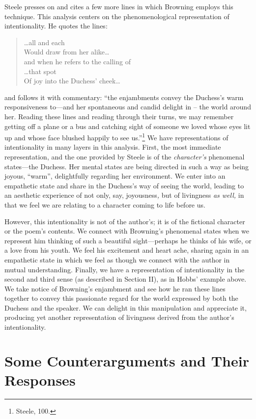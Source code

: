 Steele presses on and cites a few more lines in which Browning employs
this technique. This analysis centers on the phenomenological
representation of intentionality. He quotes the lines:
\begin{quote}
\ldots all and each\\
Would draw from her alike\ldots{}\\
and when he refers to the calling of\\
\ldots that spot\\
Of joy into the Duchess' cheek\ldots
\end{quote}
and follows it with commentary: ``the enjambments convey the Duchess's
warm responsiveness to---and her spontaneous and candid delight in --
the world around her. Reading these lines and reading through their
turns, we may remember getting off a plane or a bus and catching sight
of someone we loved whose eyes lit up and whose face blushed happily to
see us.''\footnote{Steele, 100.} We have representations of
intentionality in many layers in this analysis. First, the most
immediate representation, and the one provided by Steele is of the
\emph{character's} phenomenal states---the Duchess. Her mental states
are being directed in such a way as being joyous, ``warm'', delightfully
regarding her environment. We enter into an empathetic state and share
in the Duchess's way of seeing the world, leading to an aesthetic
experience of not only, say, joyousness\emph{,} but of livingness
\emph{as well,} in that we feel we are relating to a character coming to
life before us.

However, this intentionality is not of the author's; it is of the
fictional character or the poem's contents. We connect with Browning's
phenomenal states when we represent him thinking of such a beautiful
sight---perhaps he thinks of his wife, or a love from his youth. We
feel his excitement and heart ache, sharing again in an empathetic state
in which we feel as though we connect with the author in mutual
understanding. Finally, we have a representation of intentionality in
the second and third sense (as described in Section II), as in Hobbs'
example above. We take notice of Browning's enjambment and see how he
ran these lines together to convey this passionate regard for the world
expressed by both the Duchess and the speaker. We can delight in this
manipulation and appreciate it, producing yet another representation of
livingness derived from the author's intentionality.

\section{Some Counterarguments and Their Responses}

